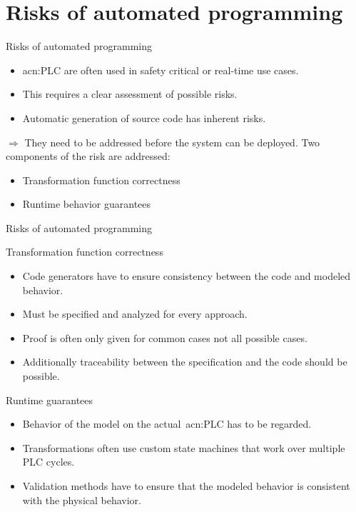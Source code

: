 \documentclass[18pt]{beamer}
\begin{document}
\section{Risks of automated programming}

\begin{frame}{Risks of automated programming}
\begin{itemize}
    \item \acrlong{acn:PLC} are often used in safety critical or real-time use cases.
    \item This requires a clear assessment of possible risks.
    \item Automatic generation of source code has inherent risks.
\end{itemize}
\pause
$\Rightarrow$ They need to be addressed before the system can be deployed.
\pause
Two components of the risk are addressed:
\begin{itemize}
    \item Transformation function correctness
    \item Runtime behavior guarantees
\end{itemize}
\end{frame}

\begin{frame}{Risks of automated programming}

\begin{block}{Transformation function correctness}
	\begin{itemize}
		\item Code generators have to ensure consistency between the code and modeled behavior.
		\item Must be specified and analyzed for every approach.
        \item Proof is often only given for common cases not all possible cases.
        \item Additionally traceability between the specification and the code should be possible.
	\end{itemize}
\end{block}
\pause
\begin{block}{Runtime guarantees}
    \begin{itemize}
        \item Behavior of the model on the actual~\acrshort{acn:PLC} has to be regarded.
        \item Transformations often use custom state machines that work over multiple PLC cycles.
        \item Validation methods have to ensure that the modeled behavior is consistent with the physical behavior.
    \end{itemize}
\end{block}
\end{frame}
\end{document}
